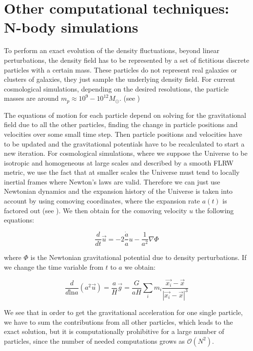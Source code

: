 \section{Other computational techniques: N-body simulations \label{sec:Computational}}

To perform an exact evolution of the density fluctuations, beyond
linear perturbations, the density field has to be represented by a
set of fictitious discrete particles with a certain mass. These particles
do not represent real galaxies or clusters of galaxies, they just
sample the underlying density field. For current cosmological simulations,
depending on the desired resolutions, the particle masses are around
$m_{p}\approx10^{9}-10^{12}M_{\odot}$. (see \citet{kuhlen_numerical_2012})

The equations of motion for each particle depend on solving for the
gravitational field due to all the other particles, finding the change
in particle positions and velocities over some small time step. Then
particle positions and velocities have to be updated and the gravitational
potentials have to be recalculated to start a new iteration. For cosmological
simulations, where we suppose the Universe to be isotropic and homogeneous
at large scales and described by a smooth FLRW metric, we use the
fact that at smaller scales the Universe must tend to locally inertial
frames where Newton's laws are valid. Therefore we can just use Newtonian
dynamics and the expansion history of the Universe is taken into account
by using comoving coordinates, where the expansion rate $a(t)$ is
factored out (see \citet{peacock_cosmological_1999,dehnen_n-body_2011}).
We then obtain for the comoving velocity $u$ the following equations:

\begin{equation}
\frac{d}{dt}\vec{u}=-2\frac{\dot{a}}{a}u-\frac{1}{a^{2}}\nabla\Phi
\end{equation}


where $\Phi$ is the Newtonian gravitational potential due to density
perturbations. If we change the time variable from $t$ to $a$ we
obtain:

\begin{equation}
\frac{d}{d\mbox{ln}a}(a^{2}\vec{u})=\frac{a}{H}\vec{g}=\frac{G}{aH}\sum_{i}m_{i}\frac{\vec{x_{i}}-\vec{x}}{\left|\vec{x_{i}}-\vec{x}\right|^{3}}
\end{equation}


We see that in order to get the gravitational acceleration for one
single particle, we have to sum the contributions from all other particles,
which leads to the exact solution, but it is computationally prohibitive
for a large number of particles, since the number of needed computations
grows as $\mathcal{O}(N^{2})$. 

